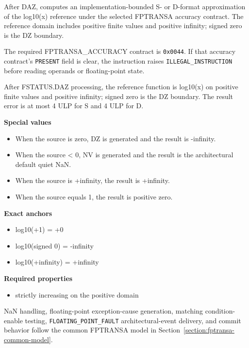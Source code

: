 After DAZ, computes an implementation-bounded S- or D-format approximation of the log10(x) reference under the selected FPTRANSA accuracy contract. The reference domain includes positive finite values and positive infinity; signed zero is the DZ boundary.

The required FPTRANSA\_ACCURACY contract is \texttt{0x0044}. If that accuracy contract's \texttt{PRESENT} field is clear, the instruction raises \texttt{ILLEGAL\_INSTRUCTION} before reading operands or floating-point state.

After FSTATUS.DAZ processing, the reference function is log10(x) on positive finite values and positive infinity; signed zero is the DZ boundary. The result error is at most 4 ULP for S and 4 ULP for D.

\textbf{Special values}\par
\begin{itemize}
\item When the source is zero, DZ is generated and the result is -infinity.
\item When the source \textless{} 0, NV is generated and the result is the architectural default quiet NaN.
\item When the source is +infinity, the result is +infinity.
\item When the source equals 1, the result is positive zero.
\end{itemize}

\textbf{Exact anchors}\par
\begin{itemize}
\item log10(+1) = +0
\item log10(signed 0) = -infinity
\item log10(+infinity) = +infinity
\end{itemize}

\textbf{Required properties}\par
\begin{itemize}
\item strictly increasing on the positive domain
\end{itemize}

NaN handling, floating-point exception-cause generation, matching condition-enable testing, \texttt{FLOATING\_POINT\_FAULT} architectural-event delivery, and commit behavior follow the common FPTRANSA model in Section~\ref{section:fptransa-common-model}.
